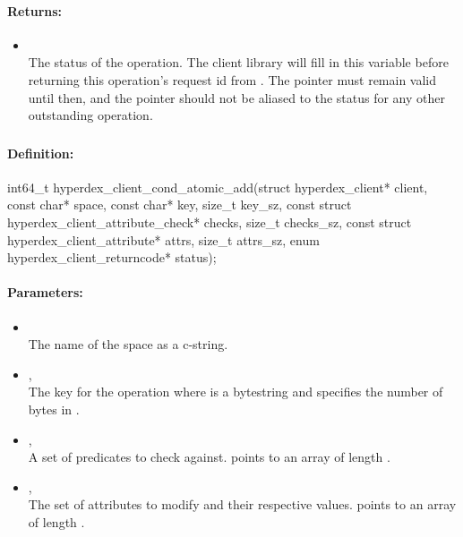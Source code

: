 \paragraph{Returns:}
\begin{itemize}[noitemsep]
\item {}\\
The status of the operation.  The client library will fill in this variable before returning this operation's request id from .  The pointer must remain valid until then, and the pointer should not be aliased to the status for any other outstanding operation.
\end{itemize}

\pagebreak
\subsubsection{}
\label{api:c:cond_atomic_add}


\paragraph{Definition:}
\begin{ccode}
int64_t hyperdex_client_cond_atomic_add(struct hyperdex_client* client,
        const char* space,
        const char* key, size_t key_sz,
        const struct hyperdex_client_attribute_check* checks, size_t checks_sz,
        const struct hyperdex_client_attribute* attrs, size_t attrs_sz,
        enum hyperdex_client_returncode* status);
\end{ccode}

\paragraph{Parameters:}
\begin{itemize}[noitemsep]
\item {}\\
The name of the space as a c-string.
\item {}, \\
The key for the operation where  is a bytestring and  specifies the number of bytes in .
\item {}, \\
A set of predicates to check against.   points to an array of length .
\item {}, \\
The set of attributes to modify and their respective values.   points to an array of length .
\end{itemize}

